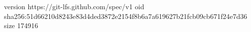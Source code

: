 version https://git-lfs.github.com/spec/v1
oid sha256:51d66210d8243e83d4ded3872e2154f8b6a7a619627b21fcb09cb671f24e7d36
size 174916
